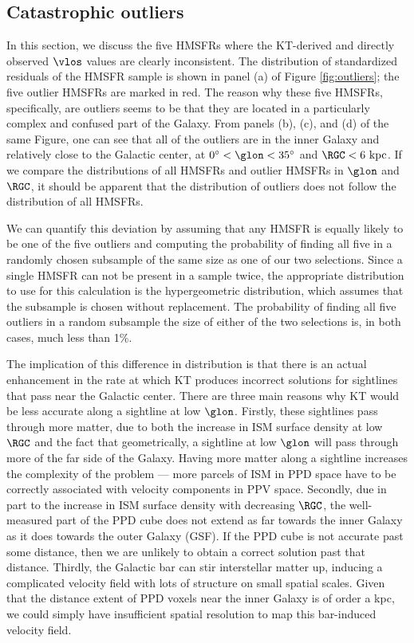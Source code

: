 \subsection{Catastrophic outliers}
\label{sec:discussion-catastrophic}
In this section, we discuss the five HMSFRs where the KT-derived and directly observed $\vlos$ values are clearly inconsistent.
The distribution of standardized residuals of the HMSFR sample is shown in panel (a) of Figure \ref{fig:outliers}; the five outlier HMSFRs are marked in red.
The reason why these five HMSFRs, specifically, are outliers seems to be that they are located in a particularly complex and confused part of the Galaxy.
From panels (b), (c), and (d) of the same Figure, one can see that all of the outliers are in the inner Galaxy and relatively close to the Galactic center, at $0^\circ < \glon < 35^\circ$ and $\RGC < 6\text{ kpc}$. 
If we compare the distributions of all HMSFRs and outlier HMSFRs in $\glon$ and $\RGC$, it should be apparent that the distribution of outliers does not follow the distribution of all HMSFRs.

We can quantify this deviation by assuming that any HMSFR is equally likely to be one of the five outliers and computing the probability of finding all five in a randomly chosen subsample of the same size as one of our two selections.
Since a single HMSFR can not be present in a sample twice, the appropriate distribution to use for this calculation is the hypergeometric distribution, which assumes that the subsample is chosen without replacement.
The probability of finding all five outliers in a random subsample the size of either of the two selections is, in both cases, much less than 1\%.

The implication of this difference in distribution is that there is an actual enhancement in the rate at which KT produces incorrect solutions for sightlines that pass near the Galactic center. 
There are three main reasons why KT would be less accurate along a sightline at low $\glon$.
Firstly, these sightlines pass through more matter, due to both the increase in ISM surface density at low $\RGC$ and the fact that geometrically, a sightline at low $\glon$ will pass through more of the far side of the Galaxy.
Having more matter along a sightline increases the complexity of the problem --- more parcels of ISM in PPD space have to be correctly associated with velocity components in PPV space.
Secondly, due in part to the increase in ISM surface density with decreasing $\RGC$, the well-measured part of the PPD cube does not extend as far towards the inner Galaxy as it does towards the outer Galaxy (GSF). 
If the PPD cube is not accurate past some distance, then we are unlikely to obtain a correct solution past that distance.
Thirdly, the Galactic bar can stir interstellar matter up, inducing a complicated velocity field with lots of structure on small spatial scales. 
Given that the distance extent of PPD voxels near the inner Galaxy is of order a kpc, we could simply have insufficient spatial resolution to map this bar-induced velocity field. 

